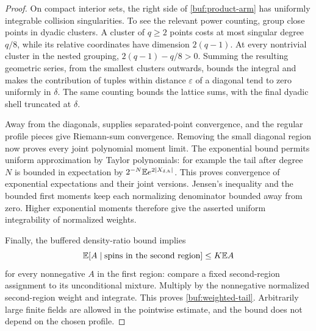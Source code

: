 \begin{proof}
On compact interior sets, the right side of
\eqref{buf:product-arm} has uniformly integrable collision
singularities.  To see the relevant power counting, group close
points in dyadic clusters.  A cluster of $q\ge2$ points costs at most
singular degree $q/8$, while its relative coordinates have dimension
$2(q-1)$.  At every nontrivial cluster in the nested grouping,
$2(q-1)-q/8>0$.  Summing the resulting geometric series, from the
smallest clusters outwards, bounds the integral and makes the
contribution of tuples within distance $\varepsilon$ of a diagonal
tend to zero uniformly in $\delta$.  The same counting bounds the
lattice sums, with the final dyadic shell truncated at $\delta$.

Away from the diagonals,  supplies separated-point
convergence, and the regular profile pieces give Riemann-sum
convergence.  Removing the small diagonal region now proves every
joint polynomial moment limit.  The exponential bound permits
uniform approximation by Taylor polynomials: for example the tail
after degree $N$ is bounded in expectation by
$2^{-N}\mathbb E e^{2|X_{\delta,h}|}$.  This proves convergence of exponential
expectations and their joint versions.  Jensen's inequality and
the bounded first moments keep each normalizing denominator bounded
away from zero.  Higher exponential moments therefore give the
asserted uniform integrability of normalized weights.

Finally, the buffered density-ratio bound implies
\[
 \mathbb E[A\mid\hbox{spins in the second region}]\le K\mathbb E A
\]
for every nonnegative $A$ in the first region: compare a fixed
second-region assignment to its unconditional mixture.  Multiply
by the nonnegative normalized second-region weight and integrate.
This proves \eqref{buf:weighted-tail}.  Arbitrarily large finite
fields are allowed in the pointwise estimate, and the bound does
not depend on the chosen profile.
\end{proof}

